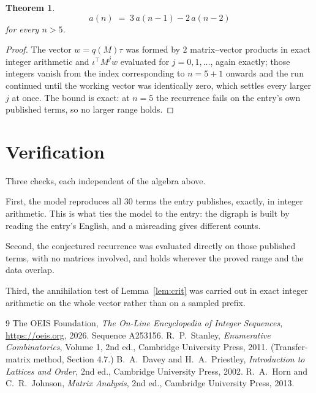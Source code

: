 \documentclass[11pt,a4paper]{article}
\theoremstyle{plain}
\newtheorem{theorem}{Theorem}
\theoremstyle{definition}
\begin{document}
\begin{theorem}
\[
a(n)\;=\;3\,a(n-1) - 2\,a(n-2)
\]
for every $n>5$.
\end{theorem}

\begin{proof}
The vector $w=q(M)\tau$ was formed by $2$ matrix--vector products in exact integer
arithmetic and $\iota^{\!\top}M^{j}w$ evaluated for $j=0,1,\dots$, again exactly; those
integers vanish from the index corresponding to $n=5+1$ onwards and the run continued
until the working vector was identically zero, which settles every larger $j$ at once. The bound is exact: at $n=5$ the recurrence fails on the entry's own published terms, so no larger range holds.
\end{proof}

\section{Verification}

Three checks, each independent of the algebra above.

First, the model reproduces all $30$ terms the entry publishes, exactly, in integer
arithmetic. This is what ties the model to the entry: the digraph is built by reading the
entry's English, and a misreading gives different counts.

Second, the conjectured recurrence was evaluated directly on those published terms, with no
matrices involved, and holds wherever the proved range and the data overlap.

Third, the annihilation test of Lemma~\ref{lem:crit} was carried out in exact integer
arithmetic on the whole vector rather than on a sampled prefix.

\begin{thebibliography}{9}
 The OEIS Foundation, \emph{The On-Line Encyclopedia of Integer
Sequences}, \url{https://oeis.org}, 2026. Sequence A253156.
 R.~P.~Stanley, \emph{Enumerative Combinatorics}, Volume 1, 2nd ed.,
Cambridge University Press, 2011. (Transfer-matrix method, Section 4.7.)
 B.~A.~Davey and H.~A.~Priestley, \emph{Introduction to Lattices and
Order}, 2nd ed., Cambridge University Press, 2002.
 R.~A.~Horn and C.~R.~Johnson, \emph{Matrix Analysis}, 2nd ed., Cambridge
University Press, 2013.
\end{thebibliography}
\end{document}
